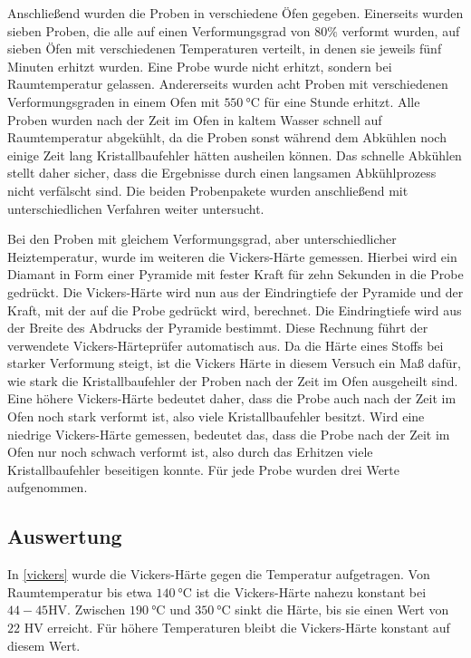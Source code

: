 \documentclass[
	a4paper,
	12pt,
	pagesize,
	ngerman
]{scrartcl}
\begin{document}
Anschließend wurden die Proben in verschiedene Öfen gegeben. Einerseits wurden sieben Proben, die alle auf einen Verformungsgrad von $80\%$ verformt wurden, auf sieben Öfen mit verschiedenen Temperaturen verteilt, in denen sie jeweils fünf Minuten erhitzt wurden. Eine Probe wurde nicht erhitzt, sondern bei Raumtemperatur gelassen. Andererseits wurden acht Proben mit verschiedenen Verformungsgraden in einem Ofen mit $\SI{550}{\degreeCelsius}$ für eine Stunde erhitzt. Alle Proben wurden nach der Zeit im Ofen in kaltem Wasser schnell auf Raumtemperatur abgekühlt, da die Proben sonst während dem Abkühlen noch einige Zeit lang Kristallbaufehler hätten ausheilen können. Das schnelle Abkühlen stellt daher sicher, dass die Ergebnisse durch einen langsamen Abkühlprozess nicht verfälscht sind. Die beiden Probenpakete wurden anschließend mit unterschiedlichen Verfahren weiter untersucht.

Bei den Proben mit gleichem Verformungsgrad, aber unterschiedlicher Heiztemperatur, wurde im weiteren die Vickers-Härte gemessen. Hierbei wird ein Diamant in Form einer Pyramide mit fester Kraft für zehn Sekunden in die Probe gedrückt. Die Vickers-Härte wird nun aus der Eindringtiefe der Pyramide und der Kraft, mit der auf die Probe gedrückt wird, berechnet. Die Eindringtiefe wird aus der Breite des Abdrucks der Pyramide bestimmt. Diese Rechnung führt der verwendete Vickers-Härteprüfer automatisch aus. Da die Härte eines Stoffs bei starker Verformung steigt, ist die Vickers Härte in diesem Versuch ein Maß dafür, wie stark die Kristallbaufehler der Proben nach der Zeit im Ofen ausgeheilt sind. Eine höhere Vickers-Härte bedeutet daher, dass die Probe auch nach der Zeit im Ofen noch stark verformt ist, also viele Kristallbaufehler besitzt. Wird eine niedrige Vickers-Härte gemessen, bedeutet das, dass die Probe nach der Zeit im Ofen nur noch schwach verformt ist, also durch das Erhitzen viele Kristallbaufehler beseitigen konnte. Für jede Probe wurden drei Werte aufgenommen.

\subsection{Auswertung}

In \cref{vickers} wurde die Vickers-Härte gegen die Temperatur aufgetragen. Von Raumtemperatur bis etwa $\SI{140}{\degreeCelsius}$ ist die Vickers-Härte nahezu konstant bei $44-45$HV. Zwischen $\SI{190}{\degreeCelsius}$ und $\SI{350}{\degreeCelsius}$ sinkt die Härte, bis sie einen Wert von $22$ HV erreicht. Für höhere Temperaturen bleibt die Vickers-Härte konstant auf diesem Wert.
\end{document}
